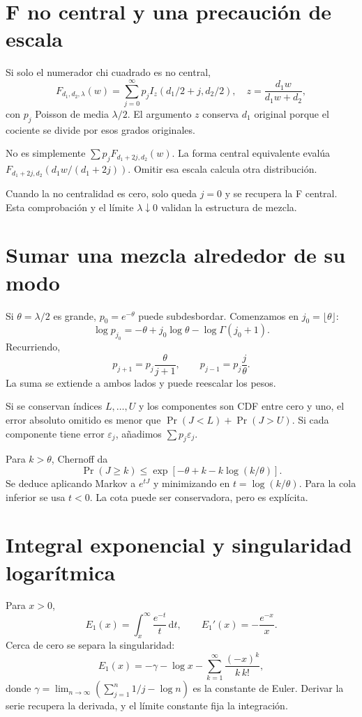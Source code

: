 \documentclass[11pt,a4paper]{article}
\newcommand{\dd}{\,\mathrm d}
\theoremstyle{definition}
\newcommand{\eps}{\varepsilon}
\begin{document}
\section{F no central y una precaución de escala}
Si solo el numerador chi cuadrado es no central,
\[
F_{d_1,d_2,\lambda}(w)
=\sum_{j=0}^\infty p_j I_z(d_1/2+j,d_2/2),
\quad z=\frac{d_1w}{d_1w+d_2},
\]
con $p_j$ Poisson de media $\lambda/2$. El argumento $z$ conserva $d_1$ original porque el cociente se divide por esos grados originales.

No es simplemente $\sum p_jF_{d_1+2j,d_2}(w)$. La forma central equivalente evalúa
$F_{d_1+2j,d_2}(d_1w/(d_1+2j))$. Omitir esa escala calcula otra distribución.

Cuando la no centralidad es cero, solo queda $j=0$ y se recupera la F central. Esta comprobación y el límite $\lambda\downarrow0$ validan la estructura de mezcla.

\section{Sumar una mezcla alrededor de su modo}
Si $\theta=\lambda/2$ es grande, $p_0=e^{-\theta}$ puede subdesbordar. Comenzamos en $j_0=\lfloor\theta\rfloor$:
\[
\log p_{j_0}=-\theta+j_0\log\theta-\log\Gamma(j_0+1).
\]
Recurriendo,
\[
p_{j+1}=p_j\frac{\theta}{j+1},\qquad
p_{j-1}=p_j\frac j\theta.
\]
La suma se extiende a ambos lados y puede reescalar los pesos.

Si se conservan índices $L,\ldots,U$ y los componentes son CDF entre cero y uno, el error absoluto omitido es menor que
$\Pr(J<L)+\Pr(J>U)$. Si cada componente tiene error $\eps_j$, añadimos $\sum p_j\eps_j$.

Para $k>\theta$, Chernoff da
\[
\Pr(J\ge k)\le
\exp[-\theta+k-k\log(k/\theta)].
\]
Se deduce aplicando Markov a $e^{tJ}$ y minimizando en $t=\log(k/\theta)$. Para la cola inferior se usa $t<0$. La cota puede ser conservadora, pero es explícita.

\section{Integral exponencial y singularidad logarítmica}
Para $x>0$,
\[
E_1(x)=\int_x^\infty\frac{e^{-t}}t\dd t,\qquad E_1'(x)=-\frac{e^{-x}}x.
\]
Cerca de cero se separa la singularidad:
\[
E_1(x)=-\gamma-\log x-
\sum_{k=1}^\infty\frac{(-x)^k}{k\,k!},
\]
donde $\gamma=\lim_{n\to\infty}(\sum_{j=1}^n1/j-\log n)$ es la constante de Euler. Derivar la serie recupera la derivada, y el límite constante fija la integración.
\end{document}
